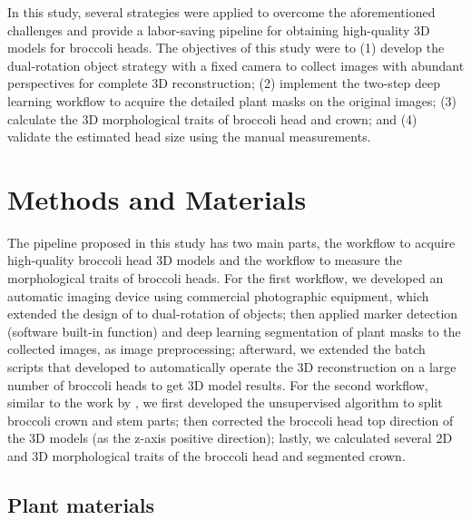 In this study, several strategies were applied to overcome the aforementioned challenges and provide a labor-saving pipeline for obtaining high-quality 3D models for broccoli heads. The objectives of this study were to (1) develop the dual-rotation object strategy with a fixed camera to collect images with abundant perspectives for complete 3D reconstruction; (2) implement the two-step deep learning workflow to acquire the detailed plant masks on the original images; (3) calculate the 3D morphological traits of broccoli head and crown; and (4) validate the estimated head size using the manual measurements. 


\section{Methods and Materials}

The pipeline proposed in this study has two main parts, the workflow to acquire high-quality broccoli head 3D models and the workflow to measure the morphological traits of broccoli heads. For the first workflow, we developed an automatic imaging device using commercial photographic equipment, which extended the design of \citet{kochi_3d_2018} to dual-rotation of objects; then applied marker detection (software built-in function) and deep learning segmentation of plant masks to the collected images, as image preprocessing; afterward, we extended the batch scripts that \citet{feldman_easydcp_2021} developed to automatically operate the 3D reconstruction on a large number of broccoli heads to get 3D model results. For the second workflow, similar to the work by \citet{feldman_easydcp_2021}, we first developed the unsupervised algorithm to split broccoli crown and stem parts; then corrected the broccoli head top direction of the 3D models (as the z-axis positive direction); lastly, we calculated several 2D and 3D morphological traits of the broccoli head and segmented crown.

\subsection{Plant materials}

